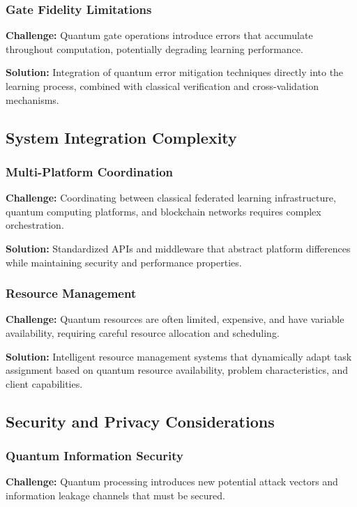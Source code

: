\documentclass[10pt,journal,compsoc]{IEEEtran}
\begin{document}
\subsubsection{Gate Fidelity Limitations}
\textbf{Challenge:} Quantum gate operations introduce errors that accumulate throughout computation, potentially degrading learning performance.

\textbf{Solution:} Integration of quantum error mitigation techniques directly into the learning process, combined with classical verification and cross-validation mechanisms.

\subsection{System Integration Complexity}

\subsubsection{Multi-Platform Coordination}
\textbf{Challenge:} Coordinating between classical federated learning infrastructure, quantum computing platforms, and blockchain networks requires complex orchestration.

\textbf{Solution:} Standardized APIs and middleware that abstract platform differences while maintaining security and performance properties.

\subsubsection{Resource Management}
\textbf{Challenge:} Quantum resources are often limited, expensive, and have variable availability, requiring careful resource allocation and scheduling.

\textbf{Solution:} Intelligent resource management systems that dynamically adapt task assignment based on quantum resource availability, problem characteristics, and client capabilities.

\subsection{Security and Privacy Considerations}

\subsubsection{Quantum Information Security}
\textbf{Challenge:} Quantum processing introduces new potential attack vectors and information leakage channels that must be secured.
\end{document}
